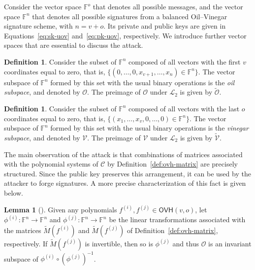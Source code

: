 \documentclass[12pt, a4paper, oneside]{memoir}
\theoremstyle{definition}
\newtheorem{definition}[theorem]{Definition}
\newtheorem{lemma}[theorem]{Lemma}
\begin{document}
Consider the vector space $\mathbb{F}^{o}$ that denotes all possible messages, and the vector space $\mathbb{F}^{n}$ that denotes all possible signatures from a balanced Oil--Vinegar signature scheme, with $n = v + o$. Its private and public keys are given in Equations~\ref{eq:sk-uov} and~\ref{eq:pk-uov}, respectively. We introduce further vector spaces that are essential to discuss the attack.

\begin{definition}\label{def:oil-subspace}
  Consider the subset of $\mathbb{F}^{n}$ composed of all vectors with the first $v$ coordinates equal to zero, that is, $\{ (0, \dots, 0, x_{v + 1}, \dots, x_{n}) \in \mathbb{F}^{n} \}$. The vector subspace of $\mathbb{F}^{n}$ formed by this set with the usual binary operations is the \emph{oil subspace}, and denoted by $\mathcal{O}$. The preimage of $\mathcal{O}$ under $\mathcal{L}_{2}$ is given by $\widetilde{\mathcal{O}}$.
\end{definition}

\begin{definition}
  Consider the subset of $\mathbb{F}^{n}$ composed of all vectors with the last $o$ coordinates equal to zero, that is, $\{ (x_{1}, \dots, x_{v}, 0, \dots, 0) \in \mathbb{F}^{n} \}$. The vector subspace of $\mathbb{F}^{n}$ formed by this set with the usual binary operations is the \emph{vinegar subspace}, and denoted by $\mathcal{V}$. The preimage of $\mathcal{V}$ under $\mathcal{L}_{2}$ is given by $\widetilde{\mathcal{V}}$.
\end{definition}

The main observation of the attack is that combinations of matrices associated with the polynomial systems of $\mathcal{C}$ by Definition~\ref{def:ovh-matrix} are precisely structured. Since the public key preserves this arrangement, it can be used by the attacker to forge signatures. A more precise characterization of this fact is given below.

\begin{lemma}[{\cite[Lemma~1]{Kipnis:199904}}]
  Given any polynomials $f^{(i)}, f^{(j)} \in \textsf{OVH}(v, o)$, let $\phi^{(i)} : \mathbb{F}^{n} \to \mathbb{F}^{n}$ and $\phi^{(j)} : \mathbb{F}^{n} \to \mathbb{F}^{n}$ be the linear transformations associated with the matrices $\widetilde{M}(f^{(i)})$ and $\widetilde{M}(f^{(j)})$ of Definition~\ref{def:ovh-matrix}, respectively. If $\widetilde{M}(f^{(j)})$ is invertible, then so is $\phi^{(j)}$ and thus $\mathcal{O}$ is an invariant subspace of $\phi^{(i)} \circ (\phi^{(j)})^{-1}$.
\end{lemma}
\end{document}
